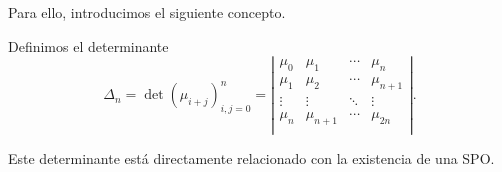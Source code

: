 Para ello, introducimos el siguiente concepto.

\begin{definicion}
    Definimos el determinante 
    \begin{equation}
        \label{eq:determinante}
        \Delta_n = \det(\mu_{i+j})_{i,j=0}^n = \left|\begin{array}{cccc}
            \mu_0 & \mu_1 & \cdots & \mu_n \\
            \mu_1 & \mu_2 & \cdots & \mu_{n+1} \\
            \vdots & \vdots & \ddots & \vdots \\
            \mu_n & \mu_{n+1} & \cdots & \mu_{2n} \\
        \end{array}\right|.
    \end{equation}
    
\end{definicion}

Este determinante está directamente relacionado con la existencia de una SPO.

